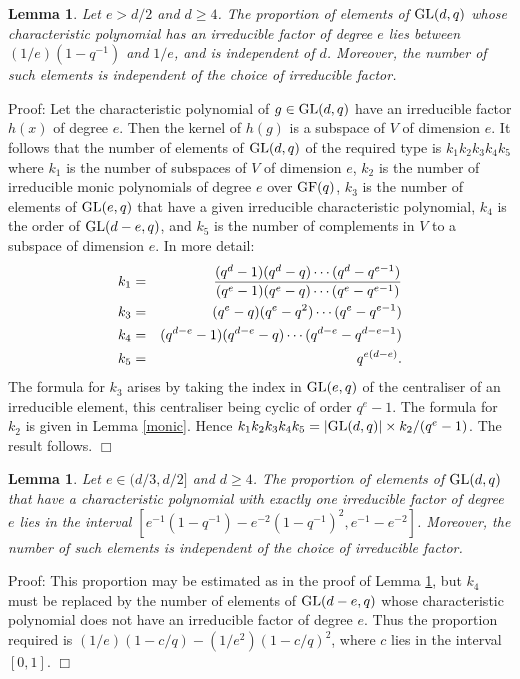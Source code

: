 \documentclass[12pt]{article}
\newtheorem{lemma}[definition]{Lemma}
\newenvironment{proof}{\normalsize {\sc Proof}:}{{\hfill $\Box$ \\}}
\def\GL{{\rm GL}}
\def\GF{{\rm GF}}
\def\ADD{Moreover, the number of such elements is
independent of the choice of irreducible factor.}
\begin{document}
\begin{lemma}\label{Lemma5.3} Let $e>d/2$ and $d \geq 4$. 
The proportion of elements of
$\GL(d,q)$ whose characteristic polynomial has an irreducible factor
of degree $e$ lies between $(1/e)(1-q^{-1})$ and $1/e$, and 
is independent of $d$. \ADD
\end{lemma}
\begin{proof}
Let the characteristic polynomial of $g\in\GL(d,q)$ have an
irreducible factor $h(x)$ of degree $e$. Then the kernel of $h(g)$ is
a subspace of $V$ of dimension $e$. It follows that the number of
elements of $\GL(d,q)$ of the required type  is $k_1k_2k_3k_4k_5$
where $k_1$ is the number of subspaces of $V$ of dimension $e$, 
$k_2$ is the number of irreducible monic polynomials of degree $e$
over $\GF(q)$, $k_3$ is the number of elements of $\GL(e,q)$ that
have a given irreducible characteristic polynomial, $k_4$ is the
order of $\GL(d-e,q)$, and $k_5$ is the number of complements in
$V$ to a subspace of dimension $e$.
In more detail: 
\begin{eqnarray*}
k_1 & = & (q^d-1)(q^d-q)\cdots(q^d-q^{e-1})\over(q^e-1)(q^e-q) \cdots (q^e-q^{e-1}) \\
k_3 & = & (q^e-q)(q^e-q^2)\cdots(q^e-q^{e-1}) \\
k_4 & = & (q^{d-e}-1)(q^{d-e}-q) \cdots (q^{d-e}-q^{d-e-1}) \\
k_5 & = & q^{e(d-e)}.
\end{eqnarray*}
The formula 
for $k_3$ arises by taking
the index in $\GL(e,q)$ of the centraliser of an irreducible element,
this centraliser being cyclic of order $q^e-1$. 
The formula for $k_2$ is given in Lemma \ref{monic}. 
Hence $k_1 k_2 k_3 k_4 k_5 = \vert\GL(d,q)\vert\times k_2/(q^e-1)$. 
The result follows.  
\end{proof}
\begin{lemma}\label{Lemma5.4} Let $e\in(d/3,d/2]$ and $d\ge 4$.  
The proportion
of elements of $\GL(d,q)$ that have a characteristic polynomial with exactly
one irreducible factor of degree $e$ lies in the 
interval $[e^{-1}(1-q^{-1})-e^{-2}(1-q^{-1})^2,e^{-1}-e^{-2}]$. \ADD
\end{lemma}
\begin{proof} This proportion may be estimated as in the 
proof of Lemma \ref{Lemma5.3},
but $k_4$ must be replaced by the number of elements 
of $\GL(d-e,q)$ whose characteristic
polynomial does not have an irreducible factor of degree $e$.  
Thus the proportion required
is $(1/e)(1-c/q)-(1/e^2)(1-c/q)^2$, where $c$ lies in the interval $[0,1]$.
\end{proof}
\end{document}
